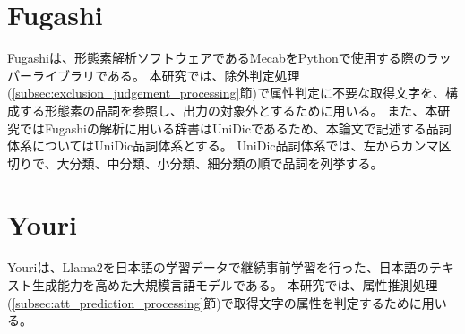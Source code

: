 \section{Fugashi}\label{sec:Fugashi}
Fugashiは、形態素解析ソフトウェアであるMecabをPythonで使用する際のラッパーライブラリである\cite{Fugashi}。
本研究では、除外判定処理(\ref{subsec:exclusion_judgement_processing}節)で属性判定に不要な取得文字を、構成する形態素の品詞を参照し、出力の対象外とするために用いる。
また、本研究ではFugashiの解析に用いる辞書はUniDicであるため、本論文で記述する品詞体系についてはUniDic品詞体系とする。
UniDic品詞体系では、左からカンマ区切りで、大分類、中分類、小分類、細分類の順で品詞を列挙する\cite{UniDic品詞体系}。


\section{Youri}\label{sec:Youri}
Youriは、Llama2を日本語の学習データで継続事前学習を行った、日本語のテキスト生成能力を高めた大規模言語モデルである\cite{Youri}。
本研究では、属性推測処理(\ref{subsec:att_prediction_processing}節)で取得文字の属性を判定するために用いる。